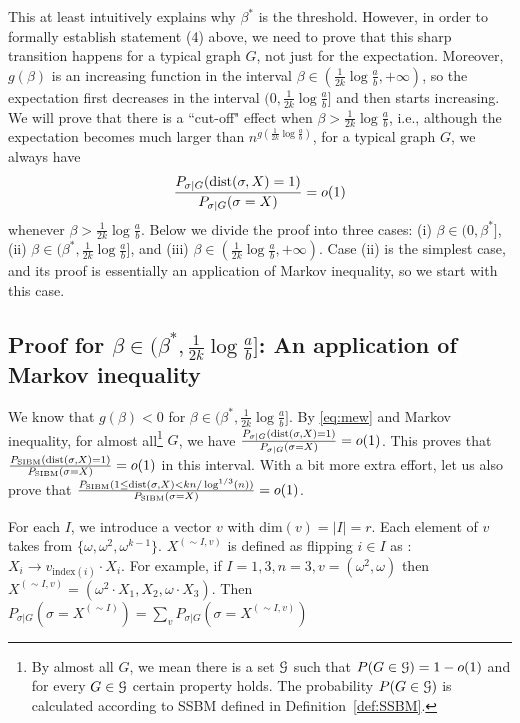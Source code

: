 \documentclass{article}
\begin{document}
This at least intuitively explains why $\beta^\ast$ is the threshold. However, in order to formally establish statement (4) above, we need to prove that this sharp transition happens for a typical graph $G$, not just for the expectation.
Moreover, $g(\beta)$ is an increasing function in the interval $\beta\in(\frac{1}{2k}\log\frac{a}{b}, +\infty)$, so the expectation first decreases in the interval $(0,\frac{1}{2k}\log\frac{a}{b}]$ and then starts increasing. We will prove that there is a ``cut-off" effect when $\beta>\frac{1}{2k}\log\frac{a}{b}$, i.e., although the expectation becomes much larger than $n^{g(\frac{1}{2k}\log\frac{a}{b})}$, for a typical graph $G$, we always have
$$
\frac{P_{\sigma|G} ( \operatorname{dist}(\sigma, X) = 1 )}{P_{\sigma|G}(\sigma= X)} 
=o(1)
$$
whenever $\beta>\frac{1}{2k}\log\frac{a}{b}$.
Below we divide the proof into three cases: (i) $\beta\in(0,\beta^\ast]$, (ii) $\beta\in(\beta^\ast,\frac{1}{2k}\log\frac{a}{b}]$, and (iii) $\beta\in(\frac{1}{2k}\log\frac{a}{b},+\infty)$.
Case (ii) is the simplest case, and its proof is essentially an application of Markov inequality, so we start with this case.

\subsection{Proof for $\beta\in(\beta^\ast,\frac{1}{2k}\log\frac{a}{b}]$: An application of Markov inequality}
\label{sect:simreg}

We know that $g(\beta)<0$ for $\beta\in(\beta^\ast,\frac{1}{2k}\log\frac{a}{b}]$. By \eqref{eq:mew} and Markov inequality, for almost all\footnote{By almost all $G$, we mean there is a set $\mathcal{G}$ such that $P(G\in\mathcal{G})=1-o(1)$ and for every $G\in\mathcal{G}$ certain property holds. The probability $P(G\in\mathcal{G})$ is calculated according to SSBM defined in Definition~\ref{def:SSBM}.} $G$, we have $\frac{P_{\sigma|G} ( \operatorname{dist}(\sigma, X) = 1 )}{P_{\sigma|G}(\sigma= X)}=o(1)$. This proves that $\frac{P_{\operatorname{SIBM}} ( \operatorname{dist}(\sigma, X) = 1 )}{P_{\operatorname{SIBM}}(\sigma= X)}=o(1)$ in this interval. With a bit more extra effort, let us also prove that $\frac{P_{\operatorname{SIBM}} ( 1\le \operatorname{dist}(\sigma, X)< kn/\log^{1/3}(n) )}{P_{\operatorname{SIBM}}(\sigma= X)}=o(1)$.

For each $I$, we introduce a vector $v$ with $\mathrm{dim}(v) = |I|=r$. Each element of $v$ takes from $\{\omega, \omega^2, \omega^{k-1}\}$.
$X^{(\sim I, v)}$ is defined as flipping $i \in I$ as : $X_i \to v_{\mathrm{index}(i)}\cdot X_i$.
For example, if $I = {1,3}, n=3, v=(\omega^2, \omega)$ then $X^{(\sim I,v)} = (\omega^2 \cdot X_1, X_2, \omega \cdot X_3)$.
Then $P_{\sigma|G}(\sigma = X^{(\sim I)})=\sum_{v}P_{\sigma|G}(\sigma = X^{(\sim I,v)})$
\end{document}

